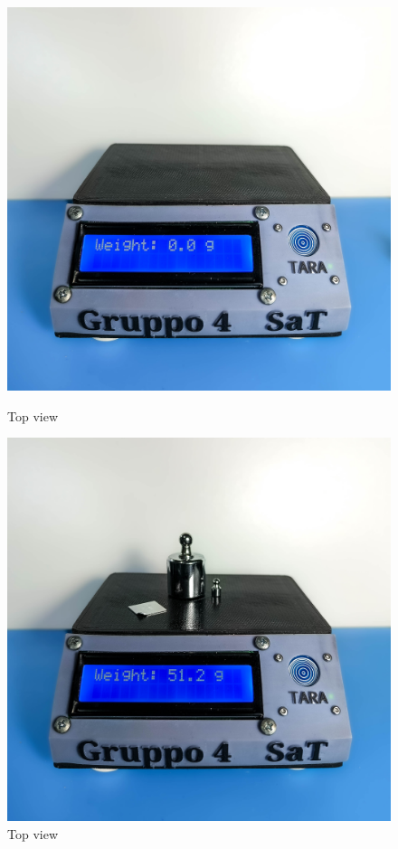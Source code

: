 \begin{figure}[ht]
\centering
\begin{minipage}{.5\textwidth} 
  \centering
  \includegraphics[width=.9\linewidth]{medias/photos/top.jpg}
  \caption{Top view}
  \label{fig:test1}
\end{minipage}%
\begin{minipage}{.5\textwidth} 
  \centering
  \includegraphics[width=.9\linewidth]{medias/photos/top2.jpg}
  \caption{Top view}
  \label{fig:test2}
\end{minipage}
\end{figure}


